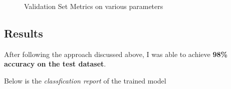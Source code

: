 \begin{figure}[h]
    \caption{Validation Set Metrics on various parameters}
\end{figure}




\subsection{Results}

After following the approach discussed above, I was able to achieve \textbf{98\% accuracy on the test dataset}.

Below is the \textit{classfication report} of the trained model

